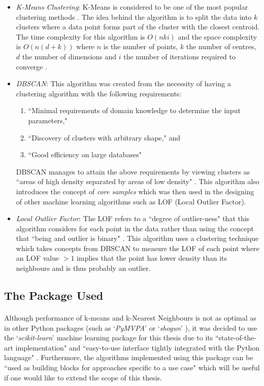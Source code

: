 \documentclass[12pt, twoside]{report}
\begin{document}
	\begin{itemize}
		\item \textit{K-Means Clustering}: K-Means is considered to be one of the most popular clustering methods \cite{r:jin}. The idea behind the algorithm is to split the data into $k$ clusters where a data point forms part of the cluster with the closest centroid. The time complexity for this algorithm is $O(nki)$ and the space complexity is $O(n(d+k))$ where $n$ is the number of points, $k$ the number of centres, $d$ the number of dimensions and $i$ the number of iterations required to converge \cite{r:jin}. 
		\item \textit{DBSCAN}: This algorithm was created from the necessity of having a clustering algorithm with the following requirements:
		\begin{enumerate}
			\item ``Minimal requirements of domain knowledge to determine the input parameters,"
			\item ``Discovery of clusters with arbitrary shape," and
			\item ``Good efficiency on large databases" \cite{r:DBSCAN}
		\end{enumerate}
		DBSCAN manages to attain the above requirements by viewing clusters as ``areas of high density separated by areas of low density" \cite{r:skclustering}. This algorithm also introduces the concept of \textit{core samples} which was then used in the designing of other machine learning algorithms such as LOF (Local Outlier Factor).
		\item \textit{Local Outlier Factor}: The LOF refers to a ``degree of outlier-ness" that this algorithm considers for each point in the data rather than using the concept that ``being and outlier is binary" \cite{r:LOF}. This algorithm uses a clustering technique which takes concepts from DBSCAN to measure the LOF of each point where an LOF value $>1$ implies that the point has lower density than its neighbours and is thus probably an outlier. 	
	\end{itemize}
	
		
	\subsection{The Package Used}
	\paragraph{ }Although performance of k-means and k-Nearest Neighbours is not as optimal as in other Python packages (such as `\textit{PyMVPA}' \cite{r:pymvpa} or `\textit{shogun}' \cite{r:shogun}), it was decided to use the `\textit{scikit-learn}' machine learning package for this thesis due to its ``state-of-the-art implementation" and ``easy-to-use interface tightly integrated with the Python language" \cite{r:sklearn}. Furthermore, the algorithms implemented using this package can be ``used as building blocks for approaches specific to a use case" \cite{r:sklearn} which will be useful if one would like to extend the scope of this thesis.
	
\end{document}
